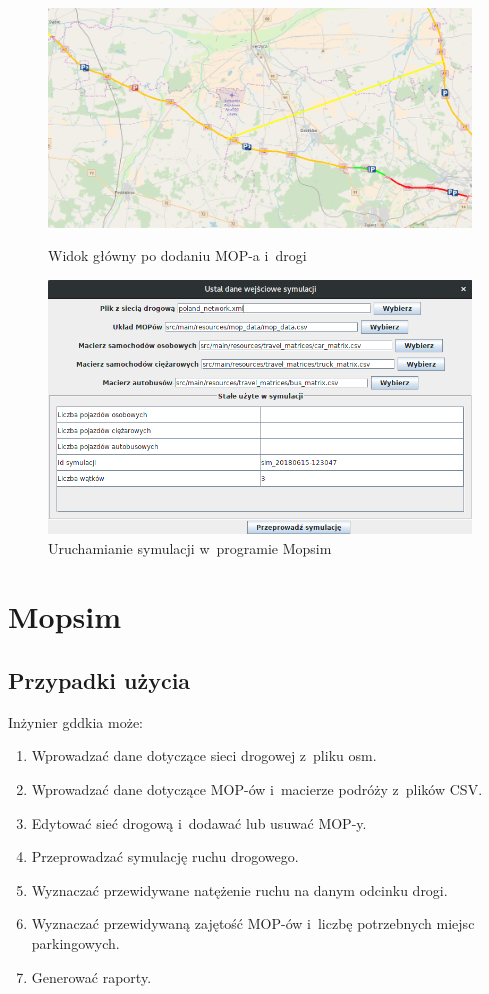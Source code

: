 \begin{figure}
  \begin{minipage}{.5\textwidth}
    \centering
    \includegraphics[width=.9\linewidth]{images/mopnik/dodany_mop_droga.png}
    \captionsetup{width=.9\linewidth}
    \caption{Widok główny po dodaniu MOP-a i~drogi}
  \end{minipage}%
  \begin{minipage}{.5\textwidth}
    \centering
    \includegraphics[width=.9\linewidth]{images/mopnik/symulacje.png}
    \captionsetup{width=.9\linewidth}
    \caption{Uruchamianie symulacji w~programie Mopsim}
  \end{minipage}
\end{figure}

\chapter{Mopsim}\label{r:Mopsim}

\section{Przypadki użycia}
Inżynier \acrshort{gddkia} może:
\begin{enumerate}
  \item Wprowadzać dane dotyczące sieci drogowej z~pliku osm.
  \item Wprowadzać dane dotyczące MOP-ów i~macierze podróży z~plików CSV.
  \item Edytować sieć drogową i~dodawać lub usuwać MOP-y.
  \item Przeprowadzać symulację ruchu drogowego.
  \item Wyznaczać przewidywane natężenie ruchu na danym odcinku drogi.
  \item Wyznaczać przewidywaną zajętość MOP-ów i~liczbę potrzebnych miejsc parkingowych.
  \item Generować raporty.
\end{enumerate}

